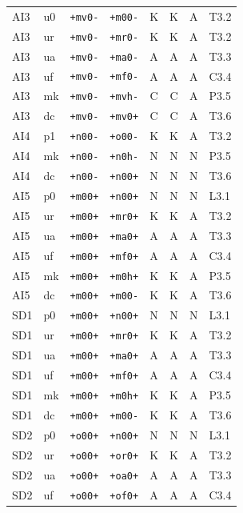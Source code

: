 {\begin{longtable}{@{}llllcccl@{}}
AI3 & u0 & \texttt{+mv0-} & \texttt{+m00-} & K & K & A & T3.2 \\
AI3 & ur & \texttt{+mv0-} & \texttt{+mr0-} & K & K & A & T3.2 \\
AI3 & ua & \texttt{+mv0-} & \texttt{+ma0-} & A & A & A & T3.3 \\
AI3 & uf & \texttt{+mv0-} & \texttt{+mf0-} & A & A & A & C3.4 \\
AI3 & mk & \texttt{+mv0-} & \texttt{+mvh-} & C & C & A & P3.5 \\
AI3 & dc & \texttt{+mv0-} & \texttt{+mv0+} & C & C & A & T3.6 \\
AI4 & p1 & \texttt{+n00-} & \texttt{+o00-} & K & K & A & T3.2 \\
AI4 & mk & \texttt{+n00-} & \texttt{+n0h-} & N & N & N & P3.5 \\
AI4 & dc & \texttt{+n00-} & \texttt{+n00+} & N & N & N & T3.6 \\
AI5 & p0 & \texttt{+m00+} & \texttt{+n00+} & N & N & N & L3.1 \\
AI5 & ur & \texttt{+m00+} & \texttt{+mr0+} & K & K & A & T3.2 \\
AI5 & ua & \texttt{+m00+} & \texttt{+ma0+} & A & A & A & T3.3 \\
AI5 & uf & \texttt{+m00+} & \texttt{+mf0+} & A & A & A & C3.4 \\
AI5 & mk & \texttt{+m00+} & \texttt{+m0h+} & K & K & A & P3.5 \\
AI5 & dc & \texttt{+m00+} & \texttt{+m00-} & K & K & A & T3.6 \\
SD1 & p0 & \texttt{+m00+} & \texttt{+n00+} & N & N & N & L3.1 \\
SD1 & ur & \texttt{+m00+} & \texttt{+mr0+} & K & K & A & T3.2 \\
SD1 & ua & \texttt{+m00+} & \texttt{+ma0+} & A & A & A & T3.3 \\
SD1 & uf & \texttt{+m00+} & \texttt{+mf0+} & A & A & A & C3.4 \\
SD1 & mk & \texttt{+m00+} & \texttt{+m0h+} & K & K & A & P3.5 \\
SD1 & dc & \texttt{+m00+} & \texttt{+m00-} & K & K & A & T3.6 \\
SD2 & p0 & \texttt{+o00+} & \texttt{+n00+} & N & N & N & L3.1 \\
SD2 & ur & \texttt{+o00+} & \texttt{+or0+} & K & K & A & T3.2 \\
SD2 & ua & \texttt{+o00+} & \texttt{+oa0+} & A & A & A & T3.3 \\
SD2 & uf & \texttt{+o00+} & \texttt{+of0+} & A & A & A & C3.4 \\

\end{longtable}}
